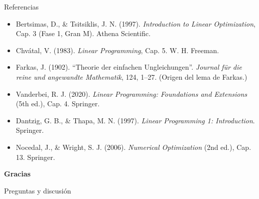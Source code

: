 \documentclass[aspectratio=169]{beamer}
\begin{document}
\begin{frame}{Referencias}
\small
\begin{itemize}
\setlength{\itemsep}{1pt}
\item Bertsimas, D., \& Tsitsiklis, J. N. (1997). \emph{Introduction to Linear Optimization}, Cap. 3 (Fase 1, Gran M). Athena Scientific.
\item Chvátal, V. (1983). \emph{Linear Programming}, Cap. 5. W. H. Freeman.
\item Farkas, J. (1902). ``Theorie der einfachen Ungleichungen''. \emph{Journal für die reine und angewandte Mathematik}, 124, 1--27. (Origen del lema de Farkas.)
\item Vanderbei, R. J. (2020). \emph{Linear Programming: Foundations and Extensions} (5th ed.), Cap. 4. Springer.
\item Dantzig, G. B., \& Thapa, M. N. (1997). \emph{Linear Programming 1: Introduction}. Springer.
\item Nocedal, J., \& Wright, S. J. (2006). \emph{Numerical Optimization} (2nd ed.), Cap. 13. Springer.
\end{itemize}
\end{frame}

\begin{frame}{}
\centering
{\Large\textbf{Gracias}}

\vspace{0.4cm}
\normalsize Preguntas y discusión
\end{frame}
\end{document}
